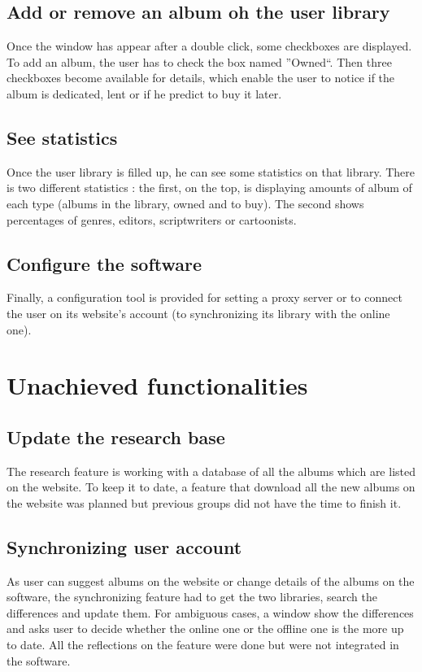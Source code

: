 \documentclass[11pt]{report} %
\begin{document}
\subsection{Add or remove an album oh the user library}
Once the window has appear after a double click, some checkboxes are displayed. To add an album, the user has to check the box named ''Owned``. Then three checkboxes become available for details, which  enable the user to notice if the album is dedicated, lent or if he predict to buy it later.

\subsection{See statistics}
Once the user library is filled up, he can see some statistics on that library. There is two different statistics : the first, on the top, is displaying amounts of album of each type (albums in the library, owned and to buy). The second shows percentages of genres, editors, scriptwriters or cartoonists.

\subsection{Configure the software}
Finally, a configuration tool is provided for setting a proxy server or to connect the user on its website's account (to synchronizing its library with the online one).

\section{Unachieved functionalities}
\subsection{Update the research base}
The research feature is working with a database of all the albums which are listed on the website. To keep it to date, a feature that download all the new albums on the website was planned but previous groups did not have the time to finish it.

\subsection{Synchronizing user account}
As user can suggest albums on the website or change details of the albums on the software, the synchronizing feature had to get the two libraries, search the differences and update them. For ambiguous cases, a window show the differences and asks user to decide whether the online one or the offline one is the more up to date. All the reflections on the feature were done but were not integrated in the software.
\end{document}

